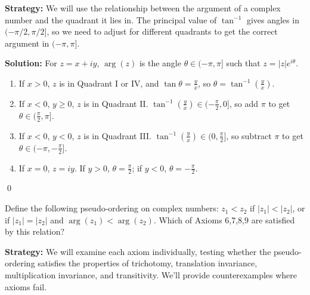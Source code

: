 \noindent\textbf{Strategy:} We will use the relationship between the argument of a complex number and the quadrant it lies in. The principal value of $\tan^{-1}$ gives angles in $(-\pi/2, \pi/2]$, so we need to adjust for different quadrants to get the correct argument in $(-\pi, \pi]$.

\bigskip\noindent\textbf{Solution:}
For \( z = x + iy \), \( \arg(z) \) is the angle \( \theta \in (-\pi, \pi] \) such that \( z = |z| e^{i\theta} \).
\begin{enumerate}[label=\alph*)]
\item If \( x > 0 \), \( z \) is in Quadrant I or IV, and \( \tan \theta = \frac{y}{x} \), so \( \theta = \tan^{-1}\left( \frac{y}{x} \right) \).
\item If \( x < 0 \), \( y \geq 0 \), \( z \) is in Quadrant II. \( \tan^{-1}\left( \frac{y}{x} \right) \in (-\frac{\pi}{2}, 0] \), so add \( \pi \) to get \( \theta \in (\frac{\pi}{2}, \pi] \).
\item If \( x < 0 \), \( y < 0 \), \( z \) is in Quadrant III. \( \tan^{-1}\left( \frac{y}{x} \right) \in (0, \frac{\pi}{2}] \), so subtract \( \pi \) to get \( \theta \in (-\pi, -\frac{\pi}{2}] \).
\item If \( x = 0 \), \( z = iy \). If \( y > 0 \), \( \theta = \frac{\pi}{2} \); if \( y < 0 \), \( \theta = -\frac{\pi}{2} \).
\end{enumerate}\qed


\begin{problembox}
Define the following pseudo-ordering on complex numbers: $z_1 < z_2$ if $|z_1| < |z_2|$, or if $|z_1|=|z_2|$ and $\arg(z_1) < \arg(z_2)$. Which of Axioms 6,7,8,9 are satisfied by this relation?
\end{problembox}

\noindent\textbf{Strategy:} We will examine each axiom individually, testing whether the pseudo-ordering satisfies the properties of trichotomy, translation invariance, multiplication invariance, and transitivity. We'll provide counterexamples where axioms fail.


